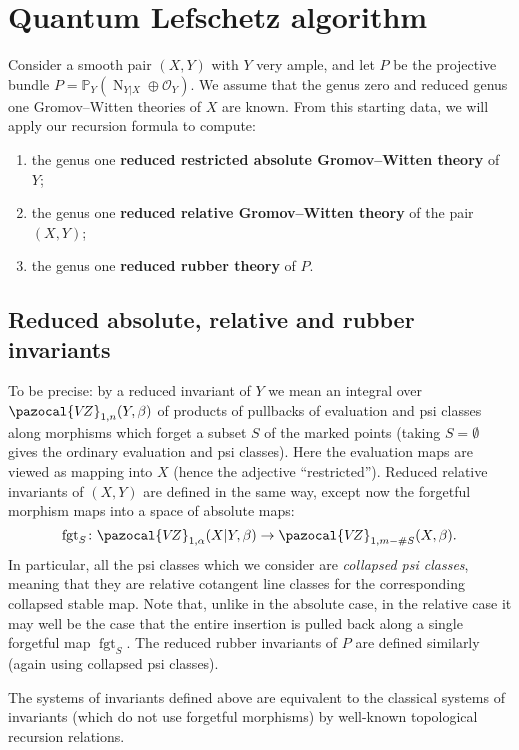 \documentclass[11pt]{amsart}
\newcommand{\PP}{\mathbb P}
\newcommand{\VZ}{\pazocal{V\!Z}}
\newcommand{\OO}{\mathcal{O}}
\renewcommand{\to}{\rightarrow}
\newcommand{\fgt}{\operatorname{fgt}}
\theoremstyle{definition}
\theoremstyle{definition}
\begin{document}
\section{Quantum Lefschetz algorithm}
Consider a smooth pair $(X,Y)$ with $Y$ very ample, and let $P$ be the projective bundle $P=\PP_Y(\operatorname{N}_{Y|X} \oplus\OO_Y)$. We assume that the genus zero and reduced genus one Gromov--Witten theories of $X$ are known. From this starting data, we will apply our recursion formula to compute:
\begin{enumerate}
\item the genus one \textbf{reduced restricted absolute Gromov--Witten theory} of $Y$;
\item the genus one \textbf{reduced relative Gromov--Witten theory} of the pair $(X,Y)$;
\item the genus one \textbf{reduced rubber theory} of $P$.
\end{enumerate}

\subsection{Reduced absolute, relative and rubber invariants} To be precise: by a reduced invariant of $Y$ we mean an integral over $\VZ_{1,n}(Y,\beta)$ of products of pullbacks of evaluation and psi classes along morphisms which forget a subset $S$ of the marked points (taking $S=\emptyset$ gives the ordinary evaluation and psi classes). Here the evaluation maps are viewed as mapping into $X$ (hence the adjective ``restricted''). Reduced relative invariants of $(X,Y)$ are defined in the same way, except now the forgetful morphism maps into a space of absolute maps:
\begin{equation*} \fgt_S \colon \VZ_{1,\alpha}(X|Y,\beta) \to \VZ_{1,m-\#S}(X,\beta).\end{equation*}
In particular, all the psi classes which we consider are \emph{collapsed psi classes}, meaning that they are relative cotangent line classes for the corresponding collapsed stable map. Note that, unlike in the absolute case, in the relative case it may well be the case that the entire insertion is pulled back along a single forgetful map $\fgt_S$. The reduced rubber invariants of $P$ are defined similarly (again using collapsed psi classes).

The systems of invariants defined above are equivalent to the classical systems of invariants (which do not use forgetful morphisms) by well-known topological recursion relations.
\end{document}

